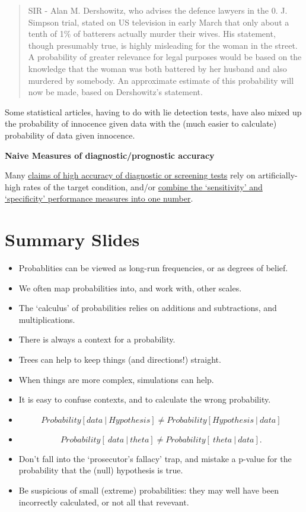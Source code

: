 \documentclass[]{book}
\begin{document}
\begin{quote}
SIR - Alan M. Dershowitz, who advises the defence lawyers in the 0. J. Simpson trial, stated on US television in early March that only about a tenth of 1\% of batterers actually murder their wives. His statement, though presumably true, is highly misleading for the woman in the street. A probability of greater relevance for legal purposes would be based on the knowledge that the woman was both battered by her husband and also murdered by somebody. An approximate estimate of this probability will now be made, based on Dershowitz's statement.
\end{quote}

Some statistical articles, having to do with lie detection tests, have also mixed up the probability of innocence given data with the (much easier to calculate) probability of data given innocence.

\textbf{Naive Measures of diagnostic/prognostic accuracy}

Many \href{http://www.medicine.mcgill.ca/epidemiology/hanley/bios601/CandH-ch0102/EyesHeatCamera.pdf}{claims of high accuracy of diagnostic or screening tests} rely on artificially-high rates of the target condition, and/or \href{https://www.swpc.noaa.gov/sites/default/files/images/u30/Murphy\%2C\%20A.H.\%2C\%201996\%20-\%20The\%20Finely\%20Affair.pdf}{combine the `sensitivity' and `specificity' performance measures into one number}.

\hypertarget{summary-slides}{%
\section{Summary Slides}\label{summary-slides}}

\begin{itemize}
\item
  Probablities can be viewed as long-run frequencies, or as degrees of belief.
\item
  We often map probabilities into, and work with, other scales.
\item
  The `calculus' of probabilities relies on additions and subtractions, and multiplications.
\item
  There is always a context for a probability.
\item
  Trees can help to keep things (and directions!) straight.
\item
  When things are more complex, simulations can help.
\item
  It is easy to confuse contexts, and to calculate the wrong probability.
\item
  \[Probability[ data \ | \ Hypothesis ] \neq Probability[ Hypothesis \ | \ data ]\]
\item
  \[Probability[ \ data \ | \  theta ] \neq Probability[ \ theta \ | \ data ].\]
\item
  Don't fall into the `prosecutor's fallacy' trap, and mistake a p-value for the probability that the (null) hypothesis is true.
\item
  Be suspicious of small (extreme) probabilities: they may well have been incorrectly calculated, or not all that revevant.
\end{itemize}
\end{document}

